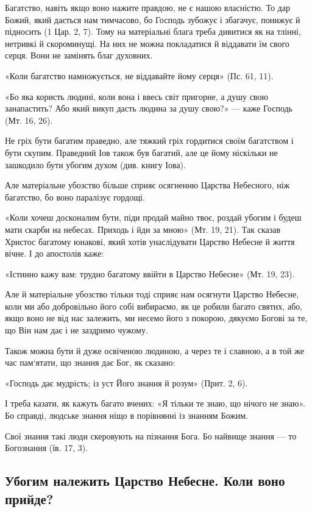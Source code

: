 \documentclass[main.tex]{subfiles}
\begin{document}
Багатство, навіть якщо воно нажите правдою, не є нашою власністю. То дар Божий, який дається нам тимчасово, бо Господь зубожує і збагачує, понижує й підносить (1 Цар. 2, 7). Тому на матеріальні блага треба дивитися як на тлінні, нетривкі й скороминущі. На них не можна покладатися й віддавати їм свого серця. Вони не замінять благ духовних.

«Коли багатство намножується, не віддавайте йому серця» (Пс. 61, 11).

«Бо яка користь людині, коли вона і ввесь світ пригорне, а душу свою занапастить? Або який викуп дасть людина за душу свою?» — каже Господь (Мт. 16, 26).

Не гріх бути багатим праведно, але тяжкий гріх гордитися своїм багатством і бути скупим. Праведний Іов також був багатий, але це йому ніскільки не зашкодило бути убогим духом (див. книгу Іова).

Але матеріальне убозство більше сприяє осягненню Царства Небесного, ніж багатство, бо воно паралізує гордощі.

«Коли хочеш досконалим бути, піди продай майно твоє, роздай убогим і будеш мати скарби на небесах. Приходь і йди за мною» (Мт. 19, 21). Так сказав Христос багатому юнакові, який хотів унаслідувати Царство Небесне й життя вічне. І до апостолів каже:

«Істинно кажу вам: трудно багатому ввійти в Царство Небесне» (Мт. 19, 23).
 
Але й матеріальне убозство тільки тоді сприяє нам осягнути Царство Небесне, коли ми або добровільно його собі вибираємо, як це робили багато святих, або, якщо воно не від нас залежить, ми несемо його з покорою, дякуємо Богові за те, що Він нам дає і не заздримо чужому.

Також можна бути й дуже освіченою людиною, а через те і славною, а в той же час пам`ятати, що знання дає Бог, як сказано:

«Господь дає мудрість; із уст Його знання й розум» (Прит. 2, 6).

І треба казати, як кажуть багато вчених: «Я тільки те знаю, що нічого не знаю». Бо справді, людське знання ніщо в порівнянні із знанням Божим.

Свої знання такі люди скеровують на пізнання Бога. Бо найвище знання — то Богознання (їв. 17, 3).

\subsection{Убогим належить Царство Небесне. Коли воно прийде?}
\end{document}
